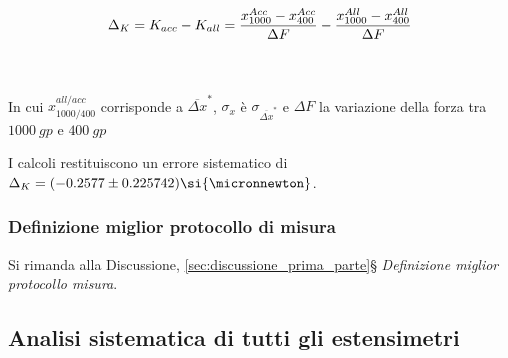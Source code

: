 \documentclass[a4paper,11pt,oneside]{article}
\begin{document}
\begin{equation*}
    \Delta_{K} = K_{acc}- K_{all}=\frac{x^{Acc}_{1000}-x^{Acc}_{400}}{\Delta F}-\frac{x^{All}_{1000}-x^{All}_{400}}{\Delta F} \\
\end{equation*}
    
\\
\\
In cui $x_{1000 / 400}^{all / acc}$ corrisponde a $\overline{\Delta x}^\ast$, $\sigma_{x}$ è $\sigma_{\overline{\Delta x}^\ast}$ e $\Delta F$ la variazione della forza tra $\SI{1000}{gp}$ e $\SI{400}{gp}$

I calcoli restituiscono un errore sistematico di $\Delta_{K} = (-0.2577 \pm 0.225742) \si{\micronnewton}$. 

\subsubsection*{Definizione miglior protocollo di misura}
Si rimanda alla Discussione, \ref{sec:discussione_prima_parte}\S \textit{ Definizione miglior protocollo misura}. 



\subsection{Analisi sistematica di tutti gli estensimetri}
\end{document}
